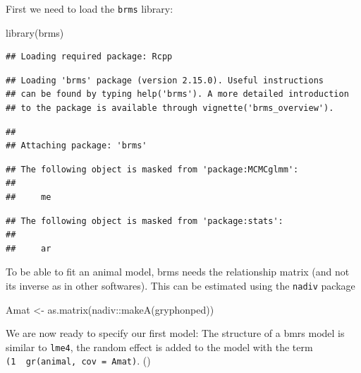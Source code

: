 \documentclass[
  12pt,
]{book}
\newenvironment{Shaded}{\begin{snugshade}}{\end{snugshade}}
\newcommand{\FunctionTok}[1]{\textcolor[rgb]{0.00,0.00,0.00}{#1}}
\newcommand{\NormalTok}[1]{#1}
\newcommand{\OtherTok}[1]{\textcolor[rgb]{0.56,0.35,0.01}{#1}}
\newcommand{\SpecialCharTok}[1]{\textcolor[rgb]{0.00,0.00,0.00}{#1}}
\begin{document}
First we need to load the \texttt{brms} library:

\begin{Shaded}
\begin{Highlighting}[]
\FunctionTok{library}\NormalTok{(brms)}
\end{Highlighting}
\end{Shaded}

\begin{verbatim}
## Loading required package: Rcpp
\end{verbatim}

\begin{verbatim}
## Loading 'brms' package (version 2.15.0). Useful instructions
## can be found by typing help('brms'). A more detailed introduction
## to the package is available through vignette('brms_overview').
\end{verbatim}

\begin{verbatim}
## 
## Attaching package: 'brms'
\end{verbatim}

\begin{verbatim}
## The following object is masked from 'package:MCMCglmm':
## 
##     me
\end{verbatim}

\begin{verbatim}
## The following object is masked from 'package:stats':
## 
##     ar
\end{verbatim}

To be able to fit an animal model, brms needs the relationship matrix (and not its inverse as in other softwares).
This can be estimated using the \texttt{nadiv} package

\begin{Shaded}
\begin{Highlighting}[]
\NormalTok{Amat }\OtherTok{\textless{}{-}} \FunctionTok{as.matrix}\NormalTok{(nadiv}\SpecialCharTok{::}\FunctionTok{makeA}\NormalTok{(gryphonped))}
\end{Highlighting}
\end{Shaded}

We are now ready to specify our first model:
The structure of a bmrs model is similar to \texttt{lme4}, the random effect is added to the model with the term \texttt{(1\ \textbar{}\ gr(animal,\ cov\ =\ Amat)}. ()
\end{document}
